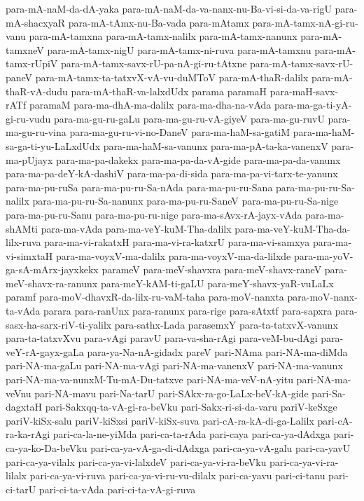 {para-mA-naM-da-dA-yaka
para-mA-naM-da-va-nanx-nu-Ba-vi-si-da-va-rigU
para-mA-shacxyaR
para-mA-tAmx-nu-Ba-vada
para-mAtamx
para-mA-tamx-nA-gi-ru-vanu
para-mA-tamxna
para-mA-tamx-nalilx
para-mA-tamx-nanunx
para-mA-tamxneV
para-mA-tamx-nigU
para-mA-tamx-ni-ruva
para-mA-tamxnu
para-mA-tamx-rUpiV
para-mA-tamx-savx-rU-pa-nA-gi-ru-tAtxne
para-mA-tamx-savx-rU-paneV
para-mA-tamx-ta-tatxvX-vA-vu-duMToV
para-mA-thaR-dalilx
para-mA-thaR-vA-dudu
para-mA-thaR-va-lalxdUdx
parama
paramaH
para-maH-savx-rATf
paramaM
para-ma-dhA-ma-dalilx
para-ma-dha-na-vAda
para-ma-ga-ti-yA-gi-ru-vudu
para-ma-gu-ru-gaLu
para-ma-gu-ru-vA-giyeV
para-ma-gu-ruvU
para-ma-gu-ru-vina
para-ma-gu-ru-vi-no-DaneV
para-ma-haM-sa-gatiM
para-ma-haM-sa-ga-ti-yu-LaLxdUdx
para-ma-haM-sa-vanunx
para-ma-pA-ta-ka-vanenxV
para-ma-pUjayx
para-ma-pa-dakekx
para-ma-pa-da-vA-gide
para-ma-pa-da-vanunx
para-ma-pa-deY-kA-dashiV
para-ma-pa-di-sida
para-ma-pa-vi-tarx-te-yanunx
para-ma-pu-ruSa
para-ma-pu-ru-Sa-nAda
para-ma-pu-ru-Sana
para-ma-pu-ru-Sa-nalilx
para-ma-pu-ru-Sa-nanunx
para-ma-pu-ru-SaneV
para-ma-pu-ru-Sa-nige
para-ma-pu-ru-Sanu
para-ma-pu-ru-nige
para-ma-sAvx-rA-jayx-vAda
para-ma-shAMti
para-ma-vAda
para-ma-veY-kuM-Tha-dalilx
para-ma-veY-kuM-Tha-da-lilx-ruva
para-ma-vi-rakatxH
para-ma-vi-ra-katxrU
para-ma-vi-samxya
para-ma-vi-simxtaH
para-ma-voyxV-ma-dalilx
para-ma-voyxV-ma-da-lilxde
para-ma-yoV-ga-sA-mArx-jayxkekx
parameV
para-meV-shavxra
para-meV-shavx-raneV
para-meV-shavx-ra-ranunx
para-meY-kAM-ti-gaLU
para-meY-shavx-yaR-vuLaLx
paramf
para-moV-dhavxR-da-lilx-ru-vaM-taha
para-moV-nanxta
para-moV-nanx-ta-vAda
parara
para-ranUnx
para-ranunx
para-rige
para-sAtxtf
para-sapxra
para-sasx-ha-sarx-riV-ti-yalilx
para-sathx-Lada
parasemxY
para-ta-tatxvX-vanunx
para-ta-tatxvXvu
para-vAgi
paravU
para-va-sha-rAgi
para-veM-bu-dAgi
para-veY-rA-gayx-gaLa
para-ya-Na-nA-gidadx
pareV
pari-NAma
pari-NA-ma-diMda
pari-NA-ma-gaLu
pari-NA-ma-vAgi
pari-NA-ma-vanenxV
pari-NA-ma-vanunx
pari-NA-ma-va-nunxM-Tu-mA-Du-tatxve
pari-NA-ma-veV-nA-yitu
pari-NA-ma-veVnu
pari-NA-mavu
pari-Na-tarU
pari-SAkx-ra-go-LaLx-beV-kA-gide
pari-Sa-dagxtaH
pari-Sakxqq-ta-vA-gi-ra-beVku
pari-Sakx-ri-si-da-varu
pariV-keSxge
pariV-kiSx-salu
pariV-kiSxsi
pariV-kiSx-suva
pari-cA-ra-kA-di-ga-Lalilx
pari-cA-ra-ka-rAgi
pari-ca-la-ne-yiMda
pari-ca-ta-rAda
pari-caya
pari-ca-ya-dAdxga
pari-ca-ya-ko-Da-beVku
pari-ca-ya-vA-ga-di-dAdxga
pari-ca-ya-vA-galu
pari-ca-yavU
pari-ca-ya-vilalx
pari-ca-ya-vi-lalxdeV
pari-ca-ya-vi-ra-beVku
pari-ca-ya-vi-ra-lilalx
pari-ca-ya-vi-ruva
pari-ca-ya-vi-ru-vu-dilalx
pari-ca-yavu
pari-ci-tanu
pari-ci-tarU
pari-ci-ta-vAda
pari-ci-ta-vA-gi-ruva
}
